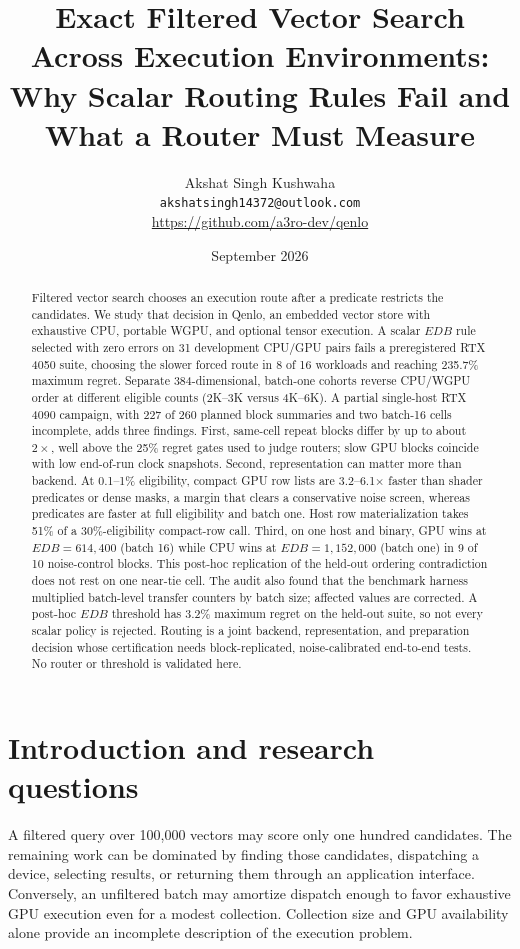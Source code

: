 \documentclass[10pt]{article}
\title{Exact Filtered Vector Search Across Execution Environments:\\Why Scalar Routing Rules Fail and What a Router Must Measure}
\author{Akshat Singh Kushwaha\\\texttt{akshatsingh14372@outlook.com}\\\url{https://github.com/a3ro-dev/qenlo}}
\date{September 2026}
\begin{document}
\maketitle
\begin{abstract}
Filtered vector search chooses an execution route after a predicate restricts the candidates. We study that decision in Qenlo, an embedded vector store with exhaustive CPU, portable WGPU, and optional tensor execution. A scalar $EDB$ rule selected with zero errors on 31 development CPU/GPU pairs fails a preregistered RTX 4050 suite, choosing the slower forced route in 8 of 16 workloads and reaching 235.7\% maximum regret. Separate 384-dimensional, batch-one cohorts reverse CPU/WGPU order at different eligible counts (2K--3K versus 4K--6K). A partial single-host RTX 4090 campaign, with 227 of 260 planned block summaries and two batch-16 cells incomplete, adds three findings. First, same-cell repeat blocks differ by up to about $2\times$, well above the 25\% regret gates used to judge routers; slow GPU blocks coincide with low end-of-run clock snapshots. Second, representation can matter more than backend. At 0.1--1\% eligibility, compact GPU row lists are 3.2--6.1$\times$ faster than shader predicates or dense masks, a margin that clears a conservative noise screen, whereas predicates are faster at full eligibility and batch one. Host row materialization takes 51\% of a 30\%-eligibility compact-row call. Third, on one host and binary, GPU wins at $EDB=614{,}400$ (batch 16) while CPU wins at $EDB=1{,}152{,}000$ (batch one) in 9 of 10 noise-control blocks. This post-hoc replication of the held-out ordering contradiction does not rest on one near-tie cell. The audit also found that the benchmark harness multiplied batch-level transfer counters by batch size; affected values are corrected. A post-hoc $EDB$ threshold has 3.2\% maximum regret on the held-out suite, so not every scalar policy is rejected. Routing is a joint backend, representation, and preparation decision whose certification needs block-replicated, noise-calibrated end-to-end tests. No router or threshold is validated here.
\end{abstract}

\section{Introduction and research questions}
A filtered query over 100,000 vectors may score only one hundred candidates. The remaining work can be dominated by finding those candidates, dispatching a device, selecting results, or returning them through an application interface. Conversely, an unfiltered batch may amortize dispatch enough to favor exhaustive GPU execution even for a modest collection. Collection size and GPU availability alone provide an incomplete description of the execution problem.
\end{document}
